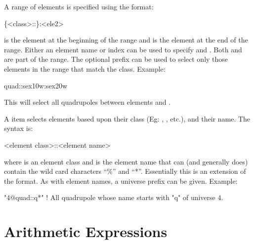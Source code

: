 A range of elements is specified using the format:
\begin{example}
  \{<class>::\}<ele1>:<ele2>
\end{example}
 is the element at the beginning of the range and
 is the element at the end of the range. Either an element
name or index can be used to specify  and . Both
 and  are part of the range. The optional  
prefix can be used to select only those elements in the range that match the class.
Example:
\begin{example}
  quad::sex10w:sex20w
\end{example}
This will select all quadrupoles between elements  and .

A  item
selects elements based upon their class (Eg: ,
, etc.), and their name. The syntax is:
\begin{example}
  <element class>::<element name>
\end{example}
where  is an element class and  is the element name that can (and generally does) contain the wild card characters
``\%'' and ``*''. Essentially this is an extension of the 
format. As with element names, a universe prefix can be 
given. Example:
\begin{example}
  "4@quad::q*"   ! All quadrupole whose name starts with "q" of universe 4.
\end{example}

\section{Arithmetic Expressions}
\label{s:arithmetic.exp}

